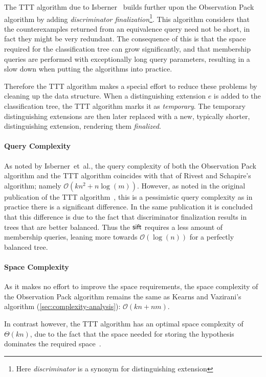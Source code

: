 \documentclass[multi,crop=false,class=article]{standalone}
\begin{document}
The TTT algorithm due to Isberner~\cite{Isberner2014b} builds further upon the
Observation Pack algorithm by adding \textit{discriminator
  finalization}\footnote{Here \textit{discriminator} is a synonym for
  distinguishing extension}. This algorithm considers that the counterexamples
returned from an equivalence query need not be short, in fact they might be very
redundant. The consequence of this is that the space required for the
classification tree can grow significantly, and that membership queries are
performed with exceptionally long query parameters, resulting in a slow down
when putting the algorithms into practice.

Therefore the TTT algorithm makes a special effort to reduce these problems by
cleaning up the data structure. When a distinguishing extension $e$ is added to
the classification tree, the TTT algorithm marks it as \textit{temporary}. The
temporary distinguishing extensions are then later replaced with a new,
typically shorter, distinguishing extension, rendering them \textit{finalized}.

\paragraph{Query Complexity} As noted by Isberner~et~al., the query complexity
of both the Observation Pack algorithm and the TTT algorithm coincides with that
of Rivest and Schapire's algorithm; namely $\mathcal{O}(kn^2 + n
\log(m))$. However, as noted in the original publication of the TTT
algorithm~\cite{Isberner2014b}, this is a pessimistic query complexity as in
practice there is a significant difference. In the same publication it is
concluded that this difference is due to the fact that discriminator
finalization results in trees that are better balanced. Thus the $\mathsf{sift}$
requires a less amount of membership queries, leaning more towards
$\mathcal{O}(\log(n))$ for a perfectly balanced tree.

\paragraph{Space Complexity} As it makes no effort to improve the space
requirements, the space complexity of the Observation Pack algorithm remains the
same as Kearns and Vazirani's algorithm (\cref{sec:complexity-analysis}):
$\mathcal{O}(kn + nm)$.

In contrast however, the TTT algorithm has an optimal space complexity of
$\Theta(kn)$, due to the fact that the space needed for storing the hypothesis
dominates the required space~\cite{Isberner2014b,Isberner2015a}.
\end{document}
